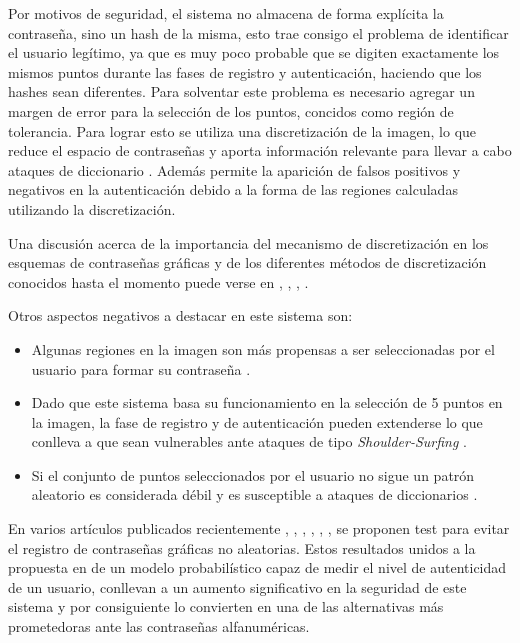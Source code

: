 Por motivos de seguridad, el sistema  no  almacena  de  forma explícita la contraseña,  sino  un hash  de la  misma,  esto  trae  consigo  el  problema de identificar el usuario legítimo, ya que es muy poco probable que se digiten exactamente los mismos puntos durante las fases de registro y autenticación, haciendo que los hashes sean diferentes. 
Para solventar este problema es necesario agregar un margen de error para la selección de los puntos, concidos como región de tolerancia. Para lograr esto se utiliza una discretización de la imagen, lo que reduce el espacio de contraseñas y aporta información relevante para  llevar  a  cabo  ataques  de  diccionario \cite{zhu2013security}. Además  permite  la  aparición  de  falsos  positivos  y negativos  en  la autenticación  debido  a  la  forma  de  las  regiones  calculadas  utilizando  la  discretización. 

 Una  discusión  acerca  de  la importancia del mecanismo de discretización en los esquemas de contraseñas gráficas y de los diferentes métodos de discretización conocidos hasta el momento puede verse en \cite{birget2006graphical}, \cite{chiasson2008centered}, \cite{bicakci2008optimal}, \cite{kirovski2007click}. 

Otros aspectos negativos a destacar en este sistema son: 

\begin{itemize}
	\item Algunas regiones en la imagen son más propensas a ser seleccionadas por el usuario para formar su contraseña \cite{mypasswordhere}.
	
	\item Dado que este sistema basa su funcionamiento en la selección de 5 puntos en la imagen, la fase de registro y de autenticación pueden extenderse lo que conlleva a que sean vulnerables ante ataques de tipo \textit{Shoulder-Surfing} \cite{rodriguez2019algoritmo}.
	
	\item Si el conjunto de puntos seleccionados por el usuario no sigue un patrón aleatorio es considerada débil y es susceptible a ataques de diccionarios \cite{rodriguez2019algoritmo}.
\end{itemize}

En varios artículos publicados recientemente \cite{sym13050777}, \cite{lissetMaster}, \cite{s22051987}, \cite{herrera2023comparacion}, \cite{herrera2023nuevo}, \cite{herrera2023nuevoregulares}, \cite{herrera2024new} se proponen test para evitar el registro de contraseñas gráficas no aleatorias. Estos resultados unidos a la propuesta en \cite{legon2019nuevo} de un modelo probabilístico capaz de medir el nivel de autenticidad de un usuario, conllevan a un aumento significativo en la seguridad de este sistema y por consiguiente lo convierten en una de las alternativas más prometedoras ante las contraseñas alfanuméricas.



